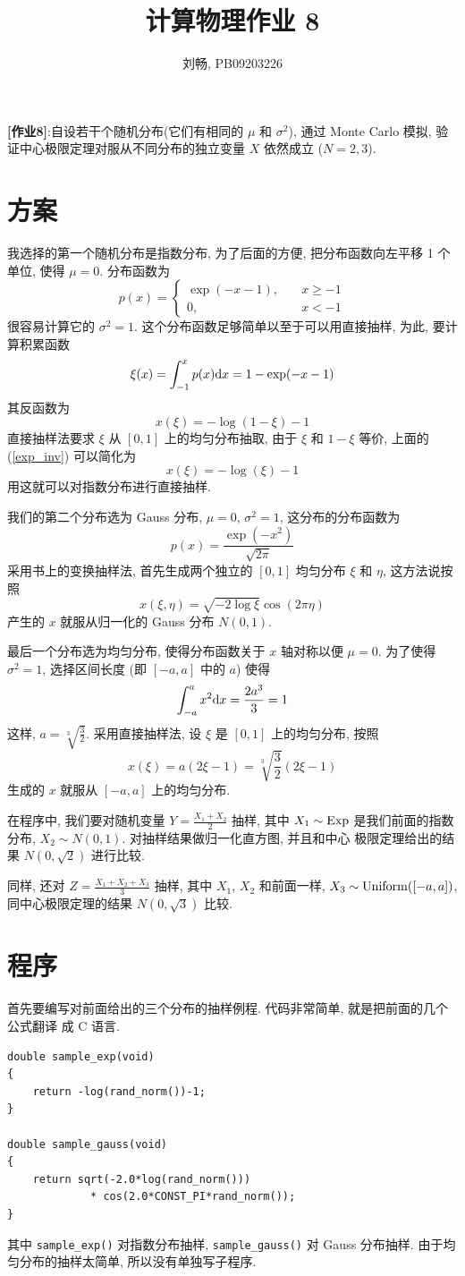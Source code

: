 \documentclass{ctexart}
\def\dd{{\rm d}}
\begin{document}
\title{计算物理作业 8}
\author{刘畅, PB09203226}
\maketitle

{\bf [作业8]}:自设若干个随机分布(它们有相同的 $\mu$ 和 $\sigma^2$),
通过 Monte Carlo 模拟, 验证中心极限定理对服从不同分布的独立变量 $X$ 依然成立
($N = 2, 3$).

\section{方案}
我选择的第一个随机分布是指数分布, 为了后面的方便, 把分布函数向左平移 1 个单位,
使得 $\mu=0$. 分布函数为
\[
p(x) = \begin{cases}
\exp(-x-1), \quad &x\ge-1\\
0,\quad & x < -1
\end{cases}
\]
很容易计算它的 $\sigma^2=1$. 这个分布函数足够简单以至于可以用直接抽样, 为此,
要计算积累函数
\[
\xi(x) = \int^x_{-1} p(x)\dd x = 1 - \exp(-x-1)
\]
其反函数为
\[\label{exp_inv}
x(\xi) = -\log(1-\xi) - 1
\]
直接抽样法要求 $\xi$ 从 $[0,1]$ 上的均匀分布抽取, 由于 $\xi$ 和 $1-\xi$ 等价,
上面的 (\ref{exp_inv}) 可以简化为
\[\label{exp_sample}
x(\xi) = -\log(\xi) - 1
\]
用这就可以对指数分布进行直接抽样.

我们的第二个分布选为 Gauss 分布, $\mu=0$, $\sigma^2=1$, 这分布的分布函数为
\[
p(x) = \frac{\exp(-x^2)}{\sqrt{2\pi}}
\]
采用书上的变换抽样法, 首先生成两个独立的 $[0,1]$ 均匀分布 $\xi$
和 $\eta$, 这方法说按照
\[
x(\xi,\eta) = \sqrt{-2\log \xi}\cos(2\pi\eta)
\]
产生的 $x$ 就服从归一化的 Gauss 分布 $N(0,1)$.

最后一个分布选为均匀分布, 使得分布函数关于 $x$ 轴对称以便 $\mu=0$. 为了使得
$\sigma^2=1$, 选择区间长度 (即 $[-a,a]$ 中的 $a$) 使得
\[
\int^{a}_{-a} x^2 \dd x = \frac{2a^3}{3} = 1
\]
这样, $a = \sqrt[3]{\frac{3}{2}}$. 采用直接抽样法, 设 $\xi$ 是 $[0,1]$
上的均匀分布, 按照
\[
x(\xi) = a(2\xi-1) = \sqrt[3]{\frac{3}{2}} (2\xi-1)
\]
生成的 $x$ 就服从 $[-a,a]$ 上的均匀分布.

在程序中, 我们要对随机变量 $Y = \frac{X_1 + X_2}{2}$ 抽样, 其中 $X_1\sim{\rm Exp}$
是我们前面的指数分布, $X_2\sim N(0,1)$. 对抽样结果做归一化直方图, 并且和中心
极限定理给出的结果 $N(0,\sqrt{2})$ 进行比较.

同样, 还对 $Z = \frac{X_1+X_2+X_3}{3}$ 抽样, 其中 $X_1$, $X_2$ 和前面一样,
$X_3\sim{\rm Uniform}([-a,a])$, 同中心极限定理的结果 $N(0,\sqrt{3})$ 比较.

\section{程序}
首先要编写对前面给出的三个分布的抽样例程. 代码非常简单, 就是把前面的几个公式翻译
成 C 语言.
\begin{verbatim}
double sample_exp(void)
{
    return -log(rand_norm())-1;
}

double sample_gauss(void)
{
    return sqrt(-2.0*log(rand_norm()))
             * cos(2.0*CONST_PI*rand_norm());
}
\end{verbatim}
其中 \verb|sample_exp()| 对指数分布抽样, \verb|sample_gauss()| 对
Gauss 分布抽样. 由于均匀分布的抽样太简单, 所以没有单独写子程序.
\end{document}
